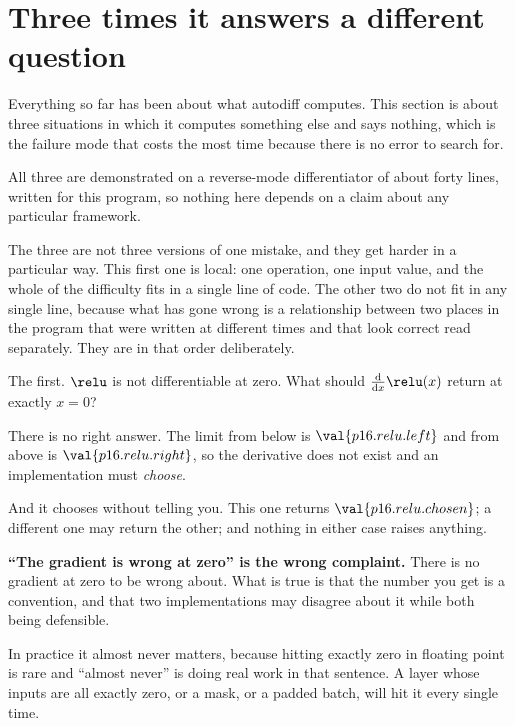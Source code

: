 \section{Three times it answers a different question}
\label{sec:P16-silent}

\begin{fr}
Everything so far has been about what autodiff computes. This section is about
three situations in which it computes something else and says nothing, which
is the failure mode that costs the most time because there is no error to
search for.

All three are demonstrated on a reverse-mode differentiator of about forty
lines, written for this program, so nothing here depends on a claim about any
particular framework.

The three are not three versions of one mistake, and they get harder in a
particular way. This first one is local: one operation, one input value, and
the whole of the difficulty fits in a single line of code. The other two do
not fit in any single line, because what has gone wrong is a relationship
between two places in the program that were written at different times and
that look correct read separately. They are in that order deliberately.

The first. $\relu$ is not differentiable at zero. What should
$\frac{\mathrm{d}}{\mathrm{d}x}\relu(x)$ return at exactly $x = 0$?
\dotline
\nextframe
\end{fr}

\begin{fr}
\begin{ansblock}
There is no right answer. The limit from below is
$\val{p16.relu.left}$ and from above is $\val{p16.relu.right}$, so the
derivative does not exist and an implementation must \emph{choose}.
\end{ansblock}

And it chooses without telling you. This one returns
$\val{p16.relu.chosen}$; a different one may return the other; and nothing in
either case raises anything.


\begin{trapbox}
\textbf{\enquote{The gradient is wrong at zero} is the wrong complaint.} There
is no gradient at zero to be wrong about. What is true is that the number you
get is a convention, and that two implementations may disagree about it while
both being defensible.

In practice it almost never matters, because hitting exactly zero in floating
point is rare \dash{} and \enquote{almost never} is doing real work in that
sentence. A layer whose inputs are all exactly zero, or a mask, or a padded
batch, will hit it every single time.
\end{trapbox}
\end{fr}

